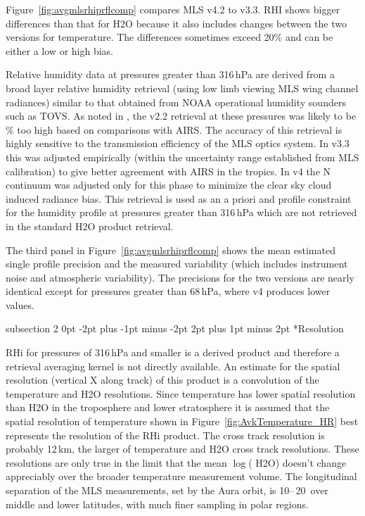 \documentclass[11pt,draft]{report}
\makeatletter
\renewcommand{\subsection}{\@startsection%
  {subsection}%
  {2}%
  {0pt}%
  {-2pt plus -1pt minus -2pt}%
  {2pt plus 1pt minus 2pt}%
  {\large\sffamily\fontseries{sb}\selectfont\flushleft\color{SectionColor}\figureversion{tabular}}}%
\makeatother
\begin{document}
Figure~\ref{fig:avgmlsrhiprflcomp} compares MLS v4.2 to v3.3. RHI shows
bigger differences than that for H\cs2O because it also includes changes
between the two versions for temperature. The differences sometimes
exceed 20\% and can be either a low or high bias.

Relative humidity data at pressures greater than 316\,hPa are derived
from a broad layer relative humidity retrieval (using low limb viewing
MLS wing channel radiances) similar to that obtained from NOAA
operational humidity sounders such as TOVS\@. As noted in
\citep{ReadEtal07}, the v2.2 retrieval at these pressures was likely to
be \% too high based on comparisons with AIRS\@.  The
accuracy of this retrieval is highly sensitive to the transmission
efficiency of the MLS optics system. In v3.3 this was adjusted
empirically (within the uncertainty range established from MLS
calibration) to give better agreement with AIRS in the tropics. In v4
the N continuum was adjusted only for this phase to minimize the
clear sky cloud induced radiance bias.  This retrieval is used as an a
priori and profile constraint for the humidity profile at pressures
greater than 316\,hPa which are not retrieved in the standard H\cs2O
product retrieval.

The third panel in Figure~\ref{fig:avgmlsrhiprflcomp} shows the mean
estimated single profile precision and the measured variability (which
includes instrument noise and atmospheric variability). The precisions
for the two versions are nearly identical except for pressures greater
than 68\,hPa, where v4 produces lower values.

\subsection*{Resolution}

RHi for pressures of 316\,hPa and smaller is a derived product and
therefore a retrieval averaging kernel is not directly available.  An
estimate for the spatial resolution (vertical X along track) of this
product is a convolution of the temperature and H\cs2O
resolutions. Since temperature has lower spatial resolution than H\cs2O
in the troposphere and lower stratosphere it is assumed that the spatial
resolution of temperature shown in Figure~\ref{fig:AvkTemperature_HR}
best represents the resolution of the RHi product. The cross track
resolution is probably 12\,km, the larger of temperature and H\cs2O
cross track resolutions.  These resolutions are only true in the limit
that the mean $\log$( H\cs2O) doesn't change appreciably over the
broader temperature measurement volume. The longitudinal separation of
the MLS measurements, set by the Aura orbit, is 10\degsym--\,20\degsym\
over middle and lower latitudes, with much finer sampling in polar
regions.
\end{document}

